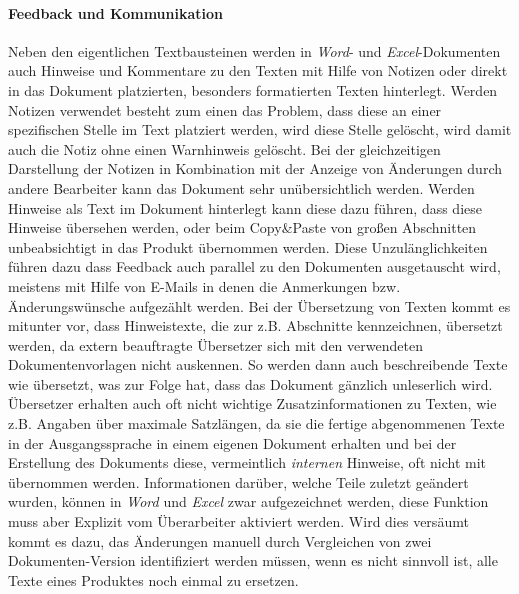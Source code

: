 \paragraph{Feedback und Kommunikation} Neben den eigentlichen Textbausteinen werden in \emph{Word}- und \emph{Excel}-Dokumenten auch Hinweise und Kommentare zu den Texten mit Hilfe von Notizen oder direkt in das Dokument platzierten, besonders formatierten Texten hinterlegt. Werden Notizen verwendet besteht zum einen das Problem, dass diese an einer spezifischen Stelle im Text platziert werden, wird diese Stelle gelöscht, wird damit auch die Notiz ohne einen Warnhinweis gelöscht. Bei der gleichzeitigen Darstellung der Notizen in Kombination mit der Anzeige von Änderungen durch andere Bearbeiter kann das Dokument sehr unübersichtlich werden. Werden Hinweise als Text im Dokument hinterlegt kann diese dazu führen, dass diese Hinweise übersehen werden, oder beim Copy\&Paste von großen Abschnitten unbeabsichtigt in das Produkt übernommen  werden. Diese Unzulänglichkeiten führen dazu dass Feedback auch parallel zu den Dokumenten ausgetauscht wird, meistens mit Hilfe von E-Mails in denen die Anmerkungen bzw. Änderungswünsche aufgezählt werden. Bei der Übersetzung von Texten kommt es mitunter vor, dass Hinweistexte, die zur z.B. Abschnitte kennzeichnen, übersetzt werden, da extern beauftragte Übersetzer sich mit den verwendeten Dokumentenvorlagen nicht auskennen. So werden dann auch beschreibende Texte wie  übersetzt, was zur Folge hat, dass das Dokument gänzlich unleserlich wird. Übersetzer erhalten auch oft nicht wichtige Zusatzinformationen zu Texten, wie z.B. Angaben über maximale Satzlängen, da sie die fertige abgenommenen Texte in der Ausgangssprache in einem eigenen Dokument erhalten und bei der Erstellung des Dokuments diese, vermeintlich \emph{internen} Hinweise, oft nicht mit übernommen werden.
Informationen darüber, welche Teile zuletzt geändert wurden, können in \emph{Word} und \emph{Excel} zwar aufgezeichnet werden, diese Funktion muss aber Explizit vom Überarbeiter aktiviert werden. Wird dies versäumt kommt es dazu, das Änderungen manuell durch Vergleichen von zwei Dokumenten-Version identifiziert werden müssen, wenn es nicht sinnvoll ist, alle Texte eines Produktes noch einmal zu ersetzen.

